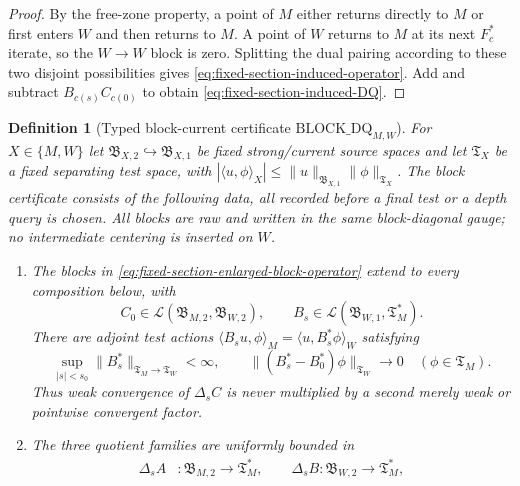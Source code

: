 \documentclass[11pt]{article}
\newtheorem{definition}[theorem]{Definition}
\begin{document}
\begin{proof}
By the free-zone property, a point of $M$ either returns directly to $M$ or
first enters $W$ and then returns to $M$.  A point of $W$ returns to $M$ at
its next $F_c^*$ iterate, so the $W\to W$ block is zero.  Splitting the dual
pairing according to these two disjoint possibilities gives
\eqref{eq:fixed-section-induced-operator}.  Add and subtract
$B_{c(s)}C_{c(0)}$ to obtain
\eqref{eq:fixed-section-induced-DQ}.
\end{proof}

\begin{definition}[Typed block-current certificate
$\mathrm{BLOCK\_DQ}_{M,W}$]
\label{def:fixed-section-block-DQ-certificate}
For $X\in\{M,W\}$ let
$\mathfrak B_{X,2}\hookrightarrow\mathfrak B_{X,1}$ be fixed strong/current
source spaces and let $\mathfrak T_X$ be a fixed separating test space, with
$|\langle u,\phi\rangle_X|\le
\|u\|_{\mathfrak B_{X,1}}\|\phi\|_{\mathfrak T_X}$.
The block certificate consists of the following data, all recorded before a
final test or a depth query is chosen.  All blocks are raw and written in the
same block-diagonal gauge; no intermediate centering is inserted on $W$.
\begin{enumerate}[label=\textup{(BD\arabic*)}]
\item The blocks in
      \eqref{eq:fixed-section-enlarged-block-operator} extend to every
      composition below, with
      \[
       C_0\in\mathcal L(\mathfrak B_{M,2},\mathfrak B_{W,2}),
       \qquad
       B_s\in\mathcal L(\mathfrak B_{W,1},\mathfrak T_M^*).
      \]
      There are adjoint test actions
      $\langle B_su,\phi\rangle_M=\langle u,B_s^*\phi\rangle_W$ satisfying
      \begin{equation}
      \label{eq:fixed-section-block-test-continuity}
       \sup_{|s|<s_0}\|B_s^*\|_{\mathfrak T_M\to\mathfrak T_W}<\infty,
       \qquad
       \|(B_s^*-B_0^*)\phi\|_{\mathfrak T_W}\longrightarrow0
       \quad(\phi\in\mathfrak T_M).
      \end{equation}
      Thus weak convergence of $\Delta_sC$ is never multiplied by a second
      merely weak or pointwise convergent factor.
\item The three quotient families are uniformly bounded in
      \begin{equation}
      \label{eq:fixed-section-block-DQ-uniform-bounds}
      \begin{split}
       \Delta_sA&:\mathfrak B_{M,2}\to\mathfrak T_M^*,\qquad
       \Delta_sB:\mathfrak B_{W,2}\to\mathfrak T_M^*,\\

\end{split}
\end{equation}
\end{enumerate}
\end{definition}
\end{document}
